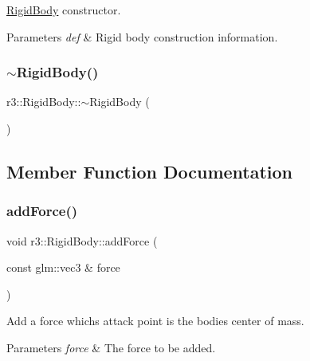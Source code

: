 \mbox{\hyperlink{classr3_1_1_rigid_body}{Rigid\+Body}} constructor. 


\begin{DoxyParams}{Parameters}
{\em def} & Rigid body construction information. \\
\hline
\end{DoxyParams}
\mbox{\label{classr3_1_1_rigid_body_a84d30e7e97d0341c08f58efc8ec60532}} 
\subsubsection{\texorpdfstring{$\sim$\+Rigid\+Body()}{~RigidBody()}}
{\footnotesize\ttfamily r3\+::\+Rigid\+Body\+::$\sim$\+Rigid\+Body (\begin{DoxyParamCaption}{ }\end{DoxyParamCaption})\hspace{0.3cm}{\ttfamily [default]}}



\subsection{Member Function Documentation}
\mbox{\label{classr3_1_1_rigid_body_a3ec9e7463d7c9a6607b35a334049a1e3}} 
\subsubsection{\texorpdfstring{add\+Force()}{addForce()}}
{\footnotesize\ttfamily void r3\+::\+Rigid\+Body\+::add\+Force (\begin{DoxyParamCaption}\item[{const glm\+::vec3 \&}]{force }\end{DoxyParamCaption})}



Add a force which\textquotesingle{}s attack point is the bodies center of mass. 


\begin{DoxyParams}{Parameters}
{\em force} & The force to be added. \\
\hline
\end{DoxyParams}
\mbox{\label{classr3_1_1_rigid_body_abba1067c4db2d246e3f82b6c1bd35c87}} 

